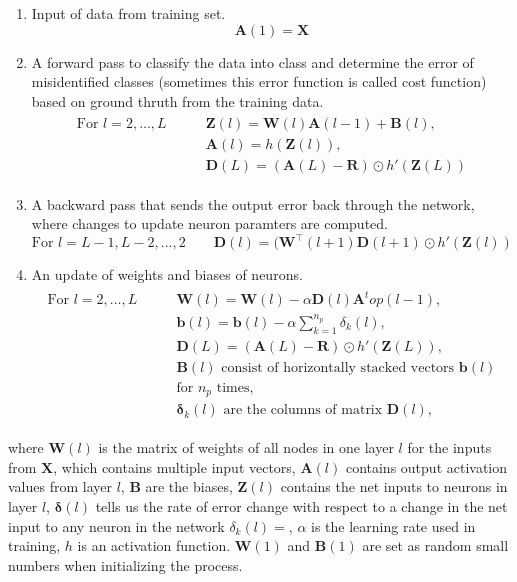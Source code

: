\begin{enumerate}
    \item Input of data from training set.
    \begin{equation}\bm{A}(1)=\bm{X}\end{equation}
    \item A forward pass to classify the data into class and determine the error of misidentified classes (sometimes this error function is called cost function) based on ground thruth from the training data.
    \begin{align}
        \begin{split}
            \mbox{For } l = 2, \dots, L \qquad & \bm{Z}(l) = \bm{W}(l)\bm{A}(l-1)+\bm{B}(l) \mbox{, }  \\
            & \bm{A}(l)=h(\bm{Z}(l)) \mbox{, }  \\
            & \bm{D}(L)=(\bm{A}(L)-\bm{R}) \odot h'(\bm{Z}(L))
        \end{split}
    \end{align}

    \item A backward pass that sends the output error back through the network, where changes to update neuron paramters are computed.
    \begin{equation}
        \mbox{For } l = L - 1 , L - 2 , \dots , 2 \qquad \bm{D}(l) = ( \bm{W}^\top ( l + 1 ) \bm{D} (l + 1 ) \odot h' ( \bm{Z} (l) )
    \end{equation}
    \item An update of weights and biases of neurons.
    \begin{align}
        \begin{split}
            \mbox{For } l = 2, \dots, L \qquad & \bm{W}(l) = \bm{W}(l) - \alpha \bm{D}(l)\bm{A}^top(l-1) \mbox{, }  \\
            & \bm{b}(l)= \bm{b}(l) - \alpha  \sum_{k=1} ^{n_p}  {\delta}_k(l) \mbox{, }   \\
            & \bm{D}(L)=(\bm{A}(L)-\bm{R}) \odot h'(\bm{Z}(L)) \mbox{, }  \\
            & \bm{B}(l) \mbox{ consist of horizontally stacked vectors } \bm{b}(l) \\ 
            & \mbox{for } n_p \mbox{ times,} \\
            & \bm{\delta}_k(l) \mbox{ are the columns of matrix } \bm{D}(l) \mbox{,}
        \end{split}
    \end{align}
\end{enumerate}
where $\bm{W}(l)$ is the matrix of weights of all nodes in one layer $l$ for the inputs from $\bm{X}$, which contains multiple input vectors, $\bm{A}(l)$ contains output activation values from layer $l$, $\bm{B}$ are the biases, $\bm{Z}(l)$ contains the net inputs to neurons in layer $l$, $\bm{\delta}(l)$ tells us the rate of error change with respect to a change in the net input to any neuron in the network $\delta_k(l) = $, $\alpha$ is the  learning rate used in training, $h$ is an activation function.  
$\bm{W}(1)$ and  $\bm{B}(1)$ are set as random small numbers when initializing the process.\cite{DIP}

